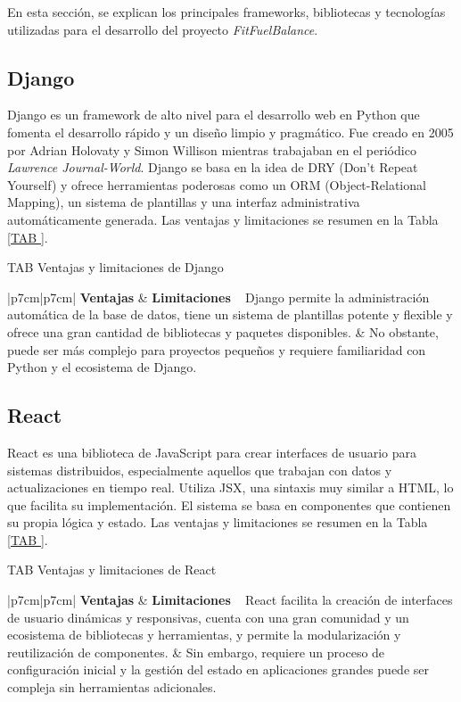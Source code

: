 En esta sección, se explican los principales frameworks, bibliotecas y tecnologías utilizadas para el desarrollo del proyecto \textit{FitFuelBalance}.

\subsection{Django}

Django es un framework de alto nivel para el desarrollo web en Python que fomenta el desarrollo rápido y un diseño limpio y pragmático. Fue creado en 2005 por Adrian Holovaty y Simon Willison mientras trabajaban en el periódico \textit{Lawrence Journal-World}. Django se basa en la idea de DRY (Don’t Repeat Yourself) y ofrece herramientas poderosas como un ORM (Object-Relational Mapping), un sistema de plantillas y una interfaz administrativa automáticamente generada. Las ventajas y limitaciones se resumen en la Tabla \ref{TAB
}.

\begin{table}[Django]{TAB
}{Ventajas y limitaciones de Django}
\begin{tabular}{|p{7cm}|p{7cm}|}
\hline
\textbf{Ventajas} & \textbf{Limitaciones} \
\hline
Django permite la administración automática de la base de datos, tiene un sistema de plantillas potente y flexible y ofrece una gran cantidad de bibliotecas y paquetes disponibles. & No obstante, puede ser más complejo para proyectos pequeños y requiere familiaridad con Python y el ecosistema de Django. \
\hline
\end{tabular}
\end{table}

\subsection{React}

React es una biblioteca de JavaScript para crear interfaces de usuario para sistemas distribuidos, especialmente aquellos que trabajan con datos y actualizaciones en tiempo real. Utiliza JSX, una sintaxis muy similar a HTML, lo que facilita su implementación. El sistema se basa en componentes que contienen su propia lógica y estado. Las ventajas y limitaciones se resumen en la Tabla \ref{TAB
}.

\begin{table}[React]{TAB
}{Ventajas y limitaciones de React}
\begin{tabular}{|p{7cm}|p{7cm}|}
\hline
\textbf{Ventajas} & \textbf{Limitaciones} \
\hline
React facilita la creación de interfaces de usuario dinámicas y responsivas, cuenta con una gran comunidad y un ecosistema de bibliotecas y herramientas, y permite la modularización y reutilización de componentes. & Sin embargo, requiere un proceso de configuración inicial y la gestión del estado en aplicaciones grandes puede ser compleja sin herramientas adicionales. \
\hline
\end{tabular}
\end{table}


